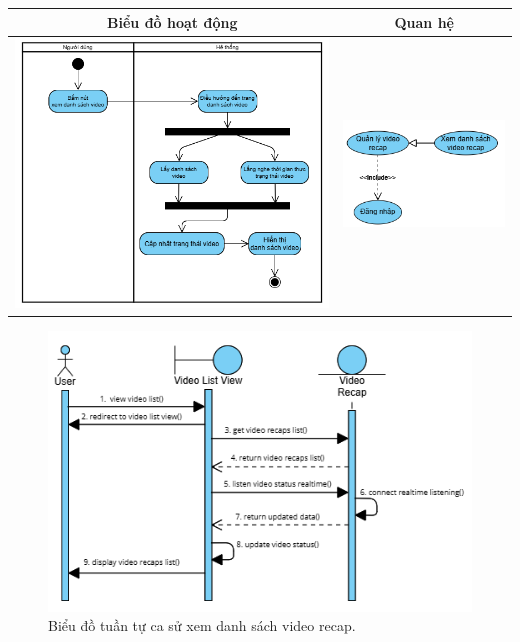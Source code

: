 \noindent 
\begin{tabular}{| c | c |}
    \hline
    \textbf{Biểu đồ hoạt động} & \textbf{Quan hệ} \\ 
    \hline
    \includegraphics[width=0.6\linewidth]{figures/c3/3-3-8-activity-diagram.png} 
    &  
    \includegraphics[width=0.35\linewidth]{figures/c3/3-3-8-relationship.png} \\ 
    \hline
\end{tabular}

\begin{figure}[ht]
    \centering  
    \includegraphics[width=1.1\textwidth]{figures/c3/3-3-8-sequence-diagram.png}
    \caption{Biểu đồ tuần tự ca sử xem danh sách video recap.}
    \label{fig:3-3-8-sequence-diagram}
\end{figure}
